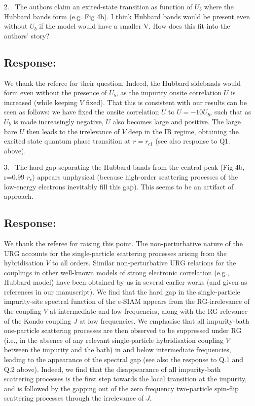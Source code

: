 \documentclass{article}
\newcommand{\response}[1]{{\color{blue}\subsection*{Response:}{#1}\vspace*{10pt}}}
\begin{document}
2.~
	The authors claim an exited-state transition as function of $U_b$ where the Hubbard bands form (e.g. Fig 4b). I think Hubbard bands would be present even without $U_b$ if the model would have a smaller V. How does this fit into the authors' story?

\response{
	We thank the referee for their question. Indeed, the Hubbard sidebands would form even without the presence of \(U_b\), as the impurity onsite correlation \(U\) is increased (while keeping \(V\) fixed). That this is consistent with our results can be seen as follows: we have fixed the onsite correlation \(U\) to \(U = -10U_b\), such that as \(U_b\) is made increasingly negative, \(U\) also becomes large and positive. The large bare $U$ then leads to the irrelevance of $V$ deep in the IR regime, obtaining the excited state quantum phase transition at $r=r_{c1}$ (see also response to Q1. above).
}

3.~
The hard gap separating the Hubbard bands from the central peak (Fig 4b, r=0.99 $r_c$) appears unphysical (because high-order scattering processes of the low-energy electrons inevitably fill this gap). This seems to be an artifact of approach.

\response{
We thank the referee for raising this point. The non-perturbative nature of the URG accounts for the single-particle scattering processes arising from the hybridisation $V$ to all orders. Similar non-perturbative URG relations for the couplings in other well-known models of strong electronic correlation (e.g., Hubbard model) have been obtained by us in several earlier works (and given as references in our manuscript). We find that the hard gap in the single-particle impurity-site spectral function of the e-SIAM appears from the RG-irrelevance of the coupling \(V\) at intermediate and low frequencies, along with the RG-relevance of the Kondo coupling \(J\) at low frequencies. We emphasise that all impurity-bath one-particle scattering processes are then observed to be suppressed under RG (i.e., in the absence of any relevant single-particle hybridisation coupling $V$ between the impurity and the bath) in and below intermediate frequencies, leading to the appearance of the spectral gap (see also the response to Q.1 and Q.2 above). Indeed, we find that the disappearance of all impurity-bath scattering processes is the first step towards the local transition at the impurity, and is followed by the gapping out of the zero frequency two-particle spin-flip scattering processes through the irrelevance of \(J\).
}
\end{document}
